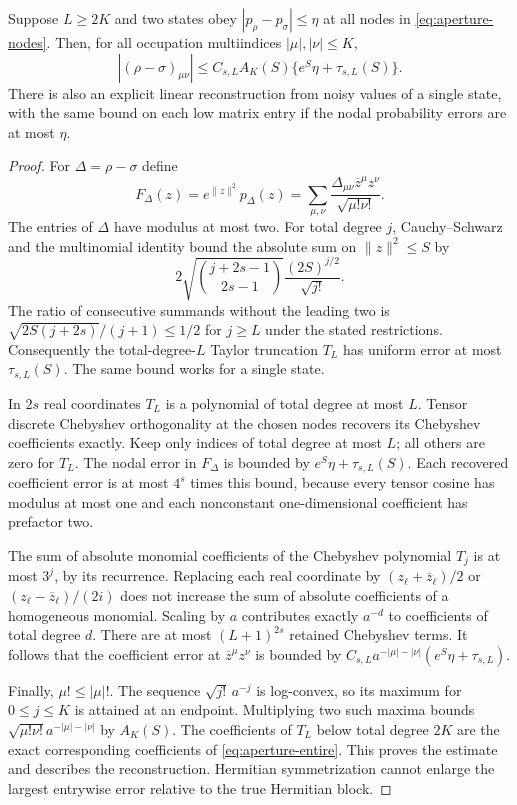 \begin{lemma}
\label{lem:aperture-coefficients}
Suppose $L\ge2K$ and two states obey
$|p_\rho-p_\sigma|\le\eta$ at all nodes in \eqref{eq:aperture-nodes}.
Then, for all occupation multiindices $|\mu|,|\nu|\le K$,
\[
 |(\rho-\sigma)_{\mu\nu}|
 \le C_{s,L}A_K(S)\{e^S\eta+\tau_{s,L}(S)\}.
 \tag{A.6}\label{eq:aperture-coefficient}
\]
There is also an explicit linear reconstruction from noisy values of a single
state, with the same bound on each low matrix entry if the nodal probability
errors are at most $\eta$.
\end{lemma}
\begin{proof}
For $\Delta=\rho-\sigma$ define
\[
 F_\Delta(z)=e^{\|z\|^2}p_\Delta(z)
   =\sum_{\mu,\nu}\frac{\Delta_{\mu\nu}
                           \overline z^\mu z^\nu}{\sqrt{\mu!\nu!}}.
 \tag{A.7}\label{eq:aperture-entire}
\]
The entries of $\Delta$ have modulus at most two. For total degree $j$,
Cauchy--Schwarz and the multinomial identity bound the absolute sum on
$\|z\|^2\le S$ by
\[
 2\sqrt{\binom{j+2s-1}{2s-1}}\frac{(2S)^{j/2}}{\sqrt{j!}}.
\]
The ratio of consecutive summands without the leading two is
$\sqrt{2S(j+2s)}/(j+1)\le1/2$ for $j\ge L$ under the stated restrictions.
Consequently the total-degree-$L$ Taylor truncation $T_L$ has uniform error
at most $\tau_{s,L}(S)$. The same bound works for a single state.

In $2s$ real coordinates $T_L$ is a polynomial of total degree at most $L$.
Tensor discrete Chebyshev orthogonality at the chosen nodes recovers its
Chebyshev coefficients exactly. Keep only indices of total degree at most
$L$; all others are zero for $T_L$. The nodal error in $F_\Delta$ is bounded
by $e^S\eta+\tau_{s,L}(S)$. Each recovered coefficient error is at most
$4^s$ times this bound, because every tensor cosine has modulus at most one
and each nonconstant one-dimensional coefficient has prefactor two.

The sum of absolute monomial coefficients of the Chebyshev polynomial $T_j$
is at most $3^j$, by its recurrence. Replacing each real coordinate by
$(z_\ell+\overline z_\ell)/2$ or
$(z_\ell-\overline z_\ell)/(2i)$ does not increase the sum of absolute
coefficients of a homogeneous monomial. Scaling by $a$ contributes exactly
$a^{-d}$ to coefficients of total degree $d$. There are at most
$(L+1)^{2s}$ retained Chebyshev terms. It follows that the coefficient error
at $\overline z^\mu z^\nu$ is bounded by
$C_{s,L}a^{-|\mu|-|\nu|}(e^S\eta+\tau_{s,L})$.

Finally, $\mu!\le|\mu|!$. The sequence $\sqrt{j!}\,a^{-j}$ is log-convex,
so its maximum for $0\le j\le K$ is attained at an endpoint. Multiplying
two such maxima bounds
$\sqrt{\mu!\nu!}a^{-|\mu|-|\nu|}$ by $A_K(S)$.
The coefficients of $T_L$ below total degree $2K$ are the exact corresponding
coefficients of \eqref{eq:aperture-entire}. This proves the estimate and
describes the reconstruction. Hermitian symmetrization cannot enlarge the
largest entrywise error relative to the true Hermitian block.
\end{proof}

